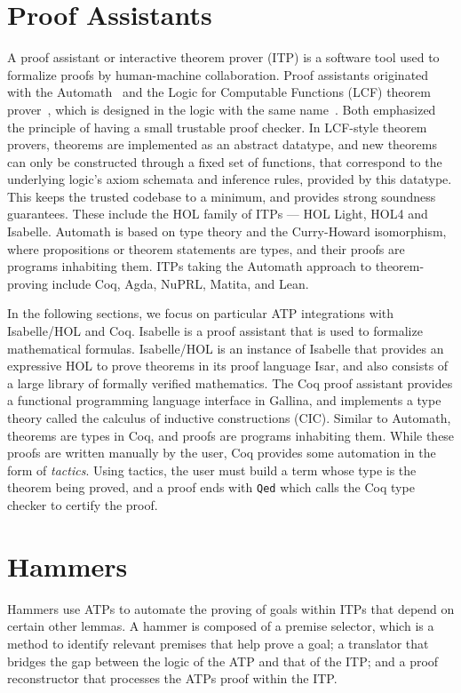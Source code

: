 \documentclass{article}
\begin{document}
\section{Proof Assistants}
\label{sec:itp}
	A proof assistant or interactive theorem prover 
	(ITP) is a software tool used to formalize
	proofs by human-machine collaboration.
	Proof assistants originated with the 
	Automath~\cite{10.1007/BFb0060623} and 
	the Logic for Computable Functions (LCF) 
	theorem prover~\cite{10.5555/891954}, 
	which is designed in the logic with the 
	same name~\cite{Loeckx1987}. Both emphasized the 
	principle of having a small trustable proof 
	checker. In LCF-style theorem provers, theorems 
	are implemented as an abstract datatype, and 
	new theorems can only be constructed through a 
	fixed set of functions, that correspond to the 
	underlying logic's axiom schemata and inference 
	rules, provided by this datatype. This keeps
	the trusted codebase to a minimum, and 
	provides strong soundness guarantees. These 
	include the HOL family of ITPs --- HOL Light, 
	HOL4 and Isabelle. Automath is based on type 
	theory and the Curry-Howard isomorphism, where 
	propositions or theorem statements are types, 
	and their proofs are programs inhabiting them. 
	ITPs taking the Automath approach to 
	theorem-proving include Coq, Agda, NuPRL, 
	Matita, and Lean.
	
	In the following sections, we focus on 
	particular ATP integrations with Isabelle/HOL 
	and Coq. Isabelle is a proof assistant that is 
	used to formalize mathematical formulas. 
	Isabelle/HOL is an instance of Isabelle that 
	provides an expressive HOL to prove theorems in 
	its proof language Isar, and also consists of a 
	large library of formally verified mathematics. 
	The Coq proof assistant provides a functional 
	programming language interface in Gallina, and 
	implements a type theory called the calculus of 
	inductive constructions (CIC). Similar to 
	Automath, theorems are types in Coq, and 
	proofs are programs inhabiting them. While these 
	proofs are written manually by the user, Coq 
	provides some automation in the form of 
	\textit{tactics}. Using tactics, the user 
	must build a term whose type is the theorem 
	being proved, and a proof ends with 
	\texttt{Qed} which calls the Coq type checker 
	to certify the proof.	
	
\section{Hammers}
\label{sec:hammer}
	Hammers use ATPs to automate the proving of goals within ITPs
	that depend on certain other lemmas. A hammer is composed of 
	a premise selector, which is a method to identify relevant 
	premises that help prove a goal; a translator that bridges 
	the gap between the logic of the ATP and that of the ITP; 
	and a proof reconstructor that processes the ATPs proof
	within the ITP.
	
\end{document}
